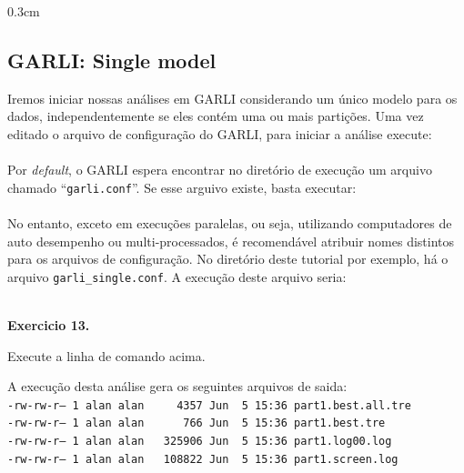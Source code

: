 \begin{refsection}
\begin {myindentpar}{0.3cm}
\begin{enumerate}[\itshape i.]
\end{enumerate}
\end{myindentpar}


\subsection{GARLI: Single model}\label{tut13:static_garli_single}

Iremos iniciar nossas análises em GARLI considerando um único modelo para os dados, independentemente se eles contém uma ou mais partições. Uma vez editado o arquivo de configuração do GARLI, para iniciar a análise execute:\\

\\

Por \textit{default}, o GARLI espera encontrar no diretório de execução um arquivo chamado ``\texttt{garli.conf}''. Se esse arguivo existe, basta executar:\\

\\

No entanto, exceto em execuções paralelas, ou seja, utilizando computadores de auto desempenho ou multi-processados, é recomendável atribuir nomes distintos para os arquivos de configuração. No diretório deste tutorial por exemplo, há o arquivo \texttt{garli\_single.conf}. A execução deste arquivo seria:\\

\\

\begin{blackBlock}{\textbf{Exercicio 13.}}\label{tut13:ex:13.1}

Execute a linha de comando acima.

\end{blackBlock}


A execução desta análise gera os seguintes arquivos de saida:\\

\noindent\texttt{-rw-rw-r--~1~alan~alan~~~~~4357~Jun~~5~15:36~part1.best.all.tre}\\
\texttt{-rw-rw-r--~1~alan~alan~~~~~~766~Jun~~5~15:36~part1.best.tre}\\
\texttt{-rw-rw-r--~1~alan~alan~~~325906~Jun~~5~15:36~part1.log00.log}\\
\texttt{-rw-rw-r--~1~alan~alan~~~108822~Jun~~5~15:36~part1.screen.log}\\


\end{refsection}

